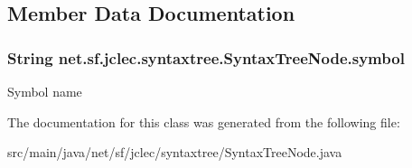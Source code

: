 \subsection{Member Data Documentation}
\hypertarget{classnet_1_1sf_1_1jclec_1_1syntaxtree_1_1_syntax_tree_node_a278880a5e241931f593f51c8a599d200}{
\subsubsection[{symbol}]{\setlength{\rightskip}{0pt plus 5cm}String net.\-sf.\-jclec.\-syntaxtree.\-Syntax\-Tree\-Node.\-symbol\hspace{0.3cm}{\ttfamily [protected]}}}\label{classnet_1_1sf_1_1jclec_1_1syntaxtree_1_1_syntax_tree_node_a278880a5e241931f593f51c8a599d200}
Symbol name 

The documentation for this class was generated from the following file\-:\begin{DoxyCompactItemize}
\item 
src/main/java/net/sf/jclec/syntaxtree/Syntax\-Tree\-Node.\-java\end{DoxyCompactItemize}
